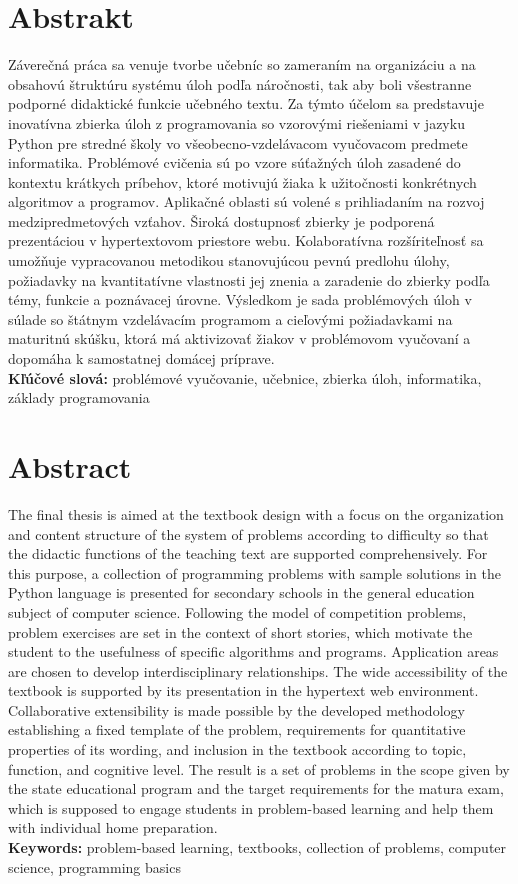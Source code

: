 \thispagestyle{empty}
\section*{Abstrakt}
Záverečná práca sa venuje tvorbe učebníc so zameraním na organizáciu a na obsahovú štruktúru systému úloh podľa náročnosti, tak aby boli všestranne podporné didaktické funkcie učebného textu. Za týmto účelom sa predstavuje inovatívna zbierka úloh z programovania so vzorovými riešeniami v jazyku Python pre stredné školy vo všeobecno-vzdelávacom vyučovacom predmete informatika. Problémové cvičenia sú po vzore súťažných úloh zasadené do kontextu krátkych príbehov, ktoré motivujú žiaka k užitočnosti konkrétnych algoritmov a programov. Aplikačné oblasti sú volené s prihliadaním na rozvoj medzipredmetových vzťahov. Široká dostupnosť zbierky je podporená prezentáciou v hypertextovom priestore webu. Kolaboratívna rozšíriteľnosť sa umožňuje vypracovanou metodikou stanovujúcou pevnú predlohu úlohy, požiadavky na kvantitatívne vlastnosti jej znenia a zaradenie do zbierky podľa témy, funkcie a poznávacej úrovne. Výsledkom je sada problémových úloh v súlade so štátnym vzdelávacím programom a cieľovými požiadavkami na maturitnú skúšku, ktorá má aktivizovať žiakov v problémovom vyučovaní a dopomáha k samostatnej domácej príprave. \\

\textbf{Kľúčové slová:} problémové vyučovanie, učebnice, zbierka úloh, informatika, základy programovania

\emptypage

\thispagestyle{empty}
\section*{Abstract}
The final thesis is aimed at the textbook design with a focus on the organization and content structure of the system of problems according to difficulty so that the didactic functions of the teaching text are supported comprehensively. For this purpose, a collection of programming problems with sample solutions in the Python language is presented for secondary schools in the general education subject of computer science. Following the model of competition problems, problem exercises are set in the context of short stories, which motivate the student to the usefulness of specific algorithms and programs. Application areas are chosen to develop interdisciplinary relationships. The wide accessibility of the textbook is supported by its presentation in the hypertext web environment.
Collaborative extensibility is made possible by the developed methodology establishing a fixed template of the problem, requirements for quantitative properties of its wording, and inclusion in the textbook according to topic, function, and cognitive level. The result is a set of problems in the scope given by the state educational program and the target requirements for the matura exam, which is supposed to engage students in problem-based learning and help them with individual home preparation. \\

\textbf{Keywords:} problem-based learning, textbooks, collection of problems, computer science, programming basics
\emptypage 